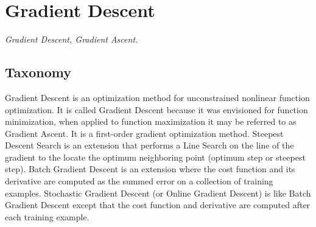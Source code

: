 
\section{Gradient Descent} 
\label{sec:gradient_descent}

\emph{Gradient Descent, Gradient Ascent.}

\subsection{Taxonomy}
Gradient Descent is an optimization method for unconstrained nonlinear function optimization. It is called Gradient Descent because it was envisioned for function minimization, when applied to function maximization it may be referred to as Gradient Ascent. It is a first-order gradient optimization method.
Steepest Descent Search is an extension that performs a Line Search on the line of the gradient to the locate the optimum neighboring point (optimum step or steepest step).
Batch Gradient Descent is an extension where the cost function and its derivative are computed as the summed error on a collection of training examples.
Stochastic Gradient Descent (or Online Gradient Descent) is like Batch Gradient Descent except that the cost function and derivative are computed after each training example.

